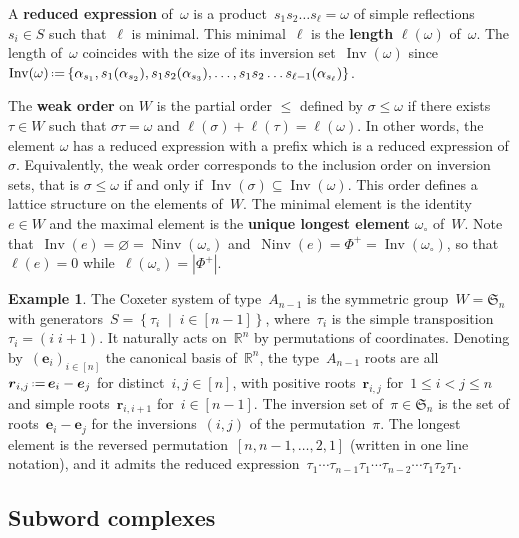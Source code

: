 \documentclass[reqno]{amsart}
\theoremstyle{definition}
\newtheorem{example}[theorem]{Example}
\newcommand{\R}{\mathbb{R}} %
\renewcommand{\b}[1]{\boldsymbol{#1}} %
\newcommand{\set}[2]{\left\{ #1 \;\middle|\; #2 \right\}} %
\newcommand{\eqdef}{\mbox{\,\raisebox{0.2ex}{\scriptsize\ensuremath{\mathrm:}}\ensuremath{=}\,}} %
\DeclareMathOperator{\Inv}{Inv} %
\DeclareMathOperator{\Ninv}{Ninv} %
\newcommand{\defn}[1]{\textbf{\textsf{\color{PineGreen} #1}}} %
\newcommand{\fS}{\mathfrak{S}} %
\newcommand{\wo}{\omega_\circ} %
\begin{document}
A \defn{reduced expression} of~$\omega$ is a product~$s_1 s_2 \dots s_\ell = \omega$ of simple reflections~$s_i \in S$ such that~$\ell$ is minimal.
This minimal~$\ell$ is the \defn{length} $\ell(\omega)$ of~$\omega$.
The length of~$\omega$ coincides with the size of its inversion set~$\Inv(\omega)$ since $\Inv(\omega) \eqdef \{\alpha_{s_1}, s_1(\alpha_{s_2}), s_1s_2(\alpha_{s_3}), \dots, s_1s_2 \dots s_{\ell-1}(\alpha_{s_\ell})\}$.

The \defn{weak order} on $W$ is the partial order $\le$ defined by $\sigma \leq \omega$ if there exists $\tau \in W$  such that $\sigma\tau = \omega$ and $\ell(\sigma) + \ell(\tau) = \ell(\omega)$.
In other words, the element $\omega$ has a reduced expression with a prefix which is a reduced expression of $\sigma$.
Equivalently, the weak order corresponds to the inclusion order on inversion sets, that is $\sigma \leq \omega$ if and only if $\Inv(\sigma) \subseteq \Inv(\omega)$.
This order defines a lattice structure on the elements of~$W$.
The minimal element is the identity $e \in W$ and the maximal element is the \defn{unique longest element} $\wo$ of~$W$.
Note that~$\Inv(e) = \varnothing = \Ninv(\wo)$ and~$\Ninv(e) = \Phi^+ = \Inv(\wo)$, so that~$\ell(e) = 0$ while~$\ell(\wo) = |\Phi^+|$.

\begin{example}
\label{exm:typeACoxeterSystem}
The Coxeter system of type~$A_{n-1}$ is the symmetric group~$W = \fS_n$ with generators~$S = \set{\tau_i}{i \in [n-1]}$, where~$\tau_i$ is the simple transposition~$\tau_i = (i \; i+1)$.
It naturally acts on~$\R^n$ by permutations of coordinates.
Denoting by~$(\b{e}_i)_{i \in [n]}$ the canonical basis of~$\R^n$, the type~$A_{n-1}$ roots are all~$\b{r}_{i,j} \eqdef \b{e}_i - \b{e}_j$ for distinct~$i,j \in [n]$, with positive roots~$\b{r}_{i,j}$ for~$1 \le i < j \le n$ and simple roots~$\b{r}_{i,i+1}$ for~$i \in [n-1]$.
The inversion set of~$\pi \in \fS_n$ is the set of roots~$\b{e}_i - \b{e}_j$ for the inversions~$(i,j)$ of the permutation~$\pi$.
The longest element is the reversed permutation~$[n, n-1, \dots, 2, 1]$ (written in one line notation), and it admits the reduced expression~$\tau_1 \cdots \tau_{n-1} \tau_1 \cdots \tau_{n-2} \cdots \tau_1 \tau_2 \tau_1$.
\end{example}


\subsection{Subword complexes}
\label{subsec:subwordComplexes}
\end{document}
